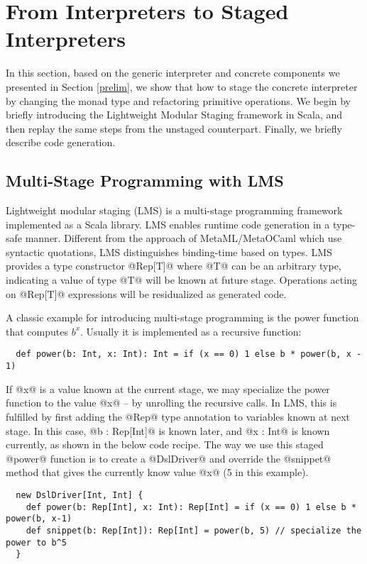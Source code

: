 \section{From Interpreters to Staged Interpreters} \label{stagedinterp}

In this section, based on the generic interpreter and concrete components we
presented in Section \ref{prelim}, we show that how to stage the concrete
interpreter by changing the monad type and refactoring primitive
operations. We begin by briefly introducing the Lightweight Modular Staging
framework in Scala, and then replay the same steps from the unstaged
counterpart. Finally, we briefly describe code generation.

\subsection{Multi-Stage Programming with LMS}

Lightweight modular staging (LMS) \cite{DBLP:conf/gpce/RompfO10} is a
multi-stage programming framework implemented as a Scala library. LMS enables
runtime code generation in a type-safe manner. Different from the approach of
MetaML/MetaOCaml \cite{DBLP:conf/flops/Kiselyov14, DBLP:conf/gpce/CalcagnoTHL03} which
use syntactic quotations, LMS distinguishes binding-time based on types. 
LMS provides a type constructor @Rep[T]@ where @T@ can be
an arbitrary type, indicating a value of type @T@ will be known at future stage.
Operations acting on @Rep[T]@ expressions will be residualized as generated
code.

A classic example for introducing multi-stage programming is the power function
that computes $b^x$. Usually it is implemented as a recursive function:
\begin{lstlisting}
  def power(b: Int, x: Int): Int = if (x == 0) 1 else b * power(b, x - 1)
\end{lstlisting}

If @x@ is a value known at the current stage, we may specialize the power function to
the value @x@ -- by unrolling the recursive calls. In LMS, this is fulfilled by
first adding the @Rep@ type annotation to variables known at next stage. In this case,
@b : Rep[Int]@ is known later, and @x : Int@ is known currently, as shown in the
below code recipe.
The way we use this staged @power@ function is to create a @DslDriver@ and override the
@snippet@ method that gives the currently know value @x@ (5 in this example).
\begin{lstlisting}
  new DslDriver[Int, Int] {
    def power(b: Rep[Int], x: Int): Rep[Int] = if (x == 0) 1 else b * power(b, x-1)
    def snippet(b: Rep[Int]): Rep[Int] = power(b, 5) // specialize the power to b^5
  }
\end{lstlisting}

